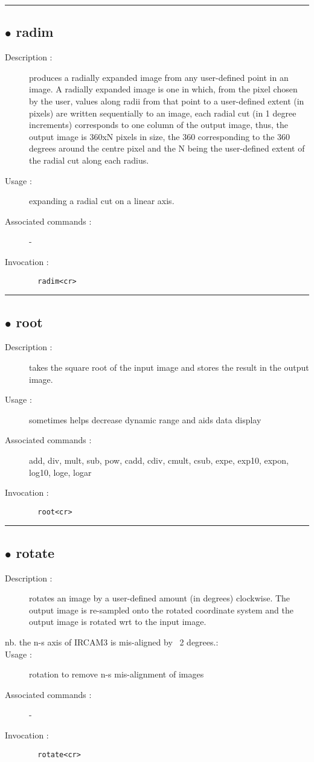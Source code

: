 \hrule \subsection*{$\bullet$ radim}
\begin{description}
\item[Description :] produces a radially expanded image from any user-defined point in
an image.  A radially expanded image is one in which, from the pixel
chosen by the user, values along radii from that point to a user-defined
extent (in pixels) are written sequentially to an image, each radial cut
(in 1 degree increments) corresponds to one column of the output image,
thus, the output image is 360xN pixels in size, the 360 corresponding to
the 360 degrees around the centre pixel and the N being the user-defined
extent of the radial cut along each radius.
\item[Usage :] expanding a radial cut on a linear axis.
\item[Associated commands :] -
\item[Invocation :]

\verb+  radim<cr> +\end{description}

\hrule \subsection*{$\bullet$ root}
\begin{description}
\item[Description :] takes the square root of the input image and stores the result in
the output image.
\item[Usage :] sometimes helps decrease dynamic range and aids data display
\item[Associated commands :] add, div, mult, sub, pow, cadd, cdiv, cmult, csub,
expe, exp10, expon, log10, loge, logar
\item[Invocation :]

\verb+  root<cr> +\end{description}

\hrule \subsection*{$\bullet$ rotate}
\begin{description}
\item[Description :] rotates an image by a user-defined amount (in degrees)
clockwise. The output image is re-sampled onto the rotated coordinate
system and the output image is rotated wrt to the input image.
\item[nb. the n-s axis of {\sc IRCAM3} is mis-aligned by ~2 degrees.:]
\item[Usage :] rotation to remove n-s mis-alignment of images
\item[Associated commands :] -
\item[Invocation :]

\verb+  rotate<cr> +\end{description}

